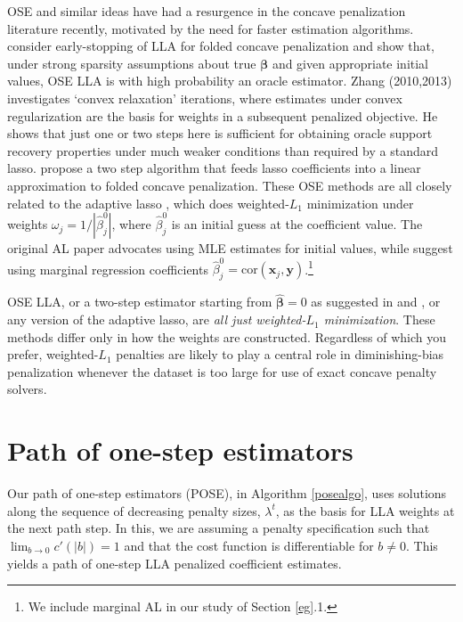 \documentclass[twoside]{article}
\newcommand{\bs}[1]{\boldsymbol{#1}}
\newcommand{\mr}[1]{\mathrm{#1}}
\newcommand{\bm}[1]{\mathbf{#1}}
\begin{document}
OSE and similar ideas have had a resurgence in the concave penalization
literature recently, motivated by the need for faster estimation algorithms.
\cite{fan_strong_2014} consider early-stopping of LLA for folded concave
penalization  and show that, under strong sparsity assumptions about true
$\bs{\beta}$ and given appropriate initial values, OSE LLA is with high
probability an oracle estimator.   Zhang (2010,2013)
\nocite{zhang_analysis_2010,zhang_multi-stage_2013} investigates  
`convex relaxation' iterations, where estimates under convex regularization
 are the basis for weights in a subsequent penalized objective.  He shows that
 just one or two steps here is sufficient for obtaining oracle support
 recovery properties under much weaker conditions than required by a standard
 lasso.  \cite{wang_calibrating_2013} propose a two step algorithm that feeds
 lasso coefficients into a linear approximation to folded concave
 penalization.  These OSE methods are all closely related to  the adaptive lasso
\citep[AL;][]{zou_adaptive_2006}, which does weighted-$L_1$ minimization under
weights $\omega_j = 1/|\hat\beta^0_j|$, where $\hat\beta^0_j$ is an initial
guess at the coefficient value.  The original AL paper advocates using MLE
estimates for initial values, while
\cite{huang_adaptive_2008} suggest using marginal regression coefficients
$\hat\beta^0_j = \mr{cor}(\bm{x}_j,\bm{y})$.\footnote{We include marginal AL in our study
of Section \ref{eg}.1.}

OSE LLA, or a two-step estimator starting from
$\bs{\hat\beta}=0$ as suggested in \cite{fan_strong_2014} and
\cite{wang_calibrating_2013}, or any version of the adaptive lasso, are {\it all just weighted-$L_1$
minimization}. These methods differ only in how the
weights are constructed.  Regardless of which you prefer, weighted-$L_1$
penalties are likely to play a central role in diminishing-bias penalization
whenever the dataset is too large for use of exact concave penalty solvers.



\section{Path of one-step estimators}
\label{pose}

Our path of one-step estimators (POSE), in Algorithm \ref{posealgo}, uses solutions along the sequence of decreasing penalty sizes, $\lambda^t$, as the basis for LLA weights at the next path step.  In this, we are assuming a penalty specification such that $\lim_{b\to 0} c'(|b|) = 1$ and that the cost function is differentiable for $b\neq 0$.  This yields a path of one-step LLA
penalized coefficient estimates. 
\end{document}
